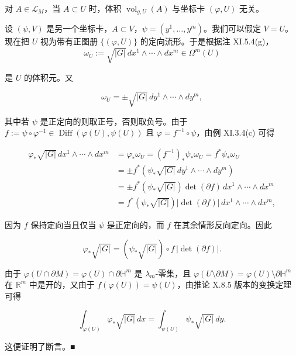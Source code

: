 \begin{lemma}

对 $ A \in \mathcal{L}_M $，当 $ A \subset U $ 时，体积 $ \operatorname{vol}_{g,U}(A) $ 与坐标卡 $ (\varphi, U) $ 无关。

\proofhead
设 $ (\psi, V) $ 是另一个坐标卡，$ A \subset V $，$ \psi = (y^1, \ldots, y^m) $。我们可以假定 $ V = U $。现在把 $ U $ 视为带有正图册 $ \{(\varphi, U)\} $ 的定向流形。于是根据注 XI.5.4(g)，
\[
\omega_U := \sqrt{|G|} \, dx^1 \wedge \cdots \wedge dx^m \in \Omega^m(U)
\]

是 $ U $ 的体积元。又

\[
\omega_U = \pm\sqrt{|G|} \, dy^1 \wedge \cdots \wedge dy^m ,
\]

其中若 $ \psi $ 是正定向的则取正号，否则取负号。由于 $ f := \psi \circ \varphi^{-1} \in \operatorname{Diff}(\varphi(U), \psi(U)) $ 且 $ \varphi = f^{-1} \circ \psi $，由例 XI.3.4(c) 可得

\begin{equation*}
\begin{aligned}
\varphi_*\sqrt{|G|} \, dx^1 \wedge \cdots \wedge dx^m &= \varphi_*\omega_U = (f^{-1})_*\psi_*\omega_U = f^*\psi_*\omega_U \\ &= \pm f^*\left(\psi_*\sqrt{|G|} \, dy^1 \wedge \cdots \wedge dy^m\right) \\ &= \pm f^*\left(\psi_*\sqrt{|G|}\right)\det(\partial f) \, dx^1 \wedge \cdots \wedge dx^m \\ &= f^*\left(\psi_*\sqrt{|G|}\right)|\det(\partial f)| \, dx^1 \wedge \cdots \wedge dx^m ,
\end{aligned}
\end{equation*}

因为 $ f $ 保持定向当且仅当 $ \psi $ 是正定向的，而 $ f $ 在其余情形反向定向。因此

\[
\varphi_*\sqrt{|G|} = \left(\psi_*\sqrt{|G|}\right) \circ f \, |\det(\partial f)| .
\]

由于 $ \varphi(U \cap \partial M) = \varphi(U) \cap \partial\mathbb{H}^m $ 是 $ \lambda_m $-零集，且 $ \varphi(U \setminus \partial M) = \varphi(U) \setminus \partial\mathbb{H}^m $ 在 $ \mathbb{R}^m $ 中是开的，又由于 $ f(\varphi(U)) = \psi(U) $，由推论 X.8.5 版本的变换定理可得

\[
\int_{\varphi(U)} \varphi_*\sqrt{|G|} \, dx = \int_{\psi(U)} \psi_*\sqrt{|G|} \, dy .
\]

这便证明了断言。\nobreak\hspace{0.35em}■

\end{lemma}

